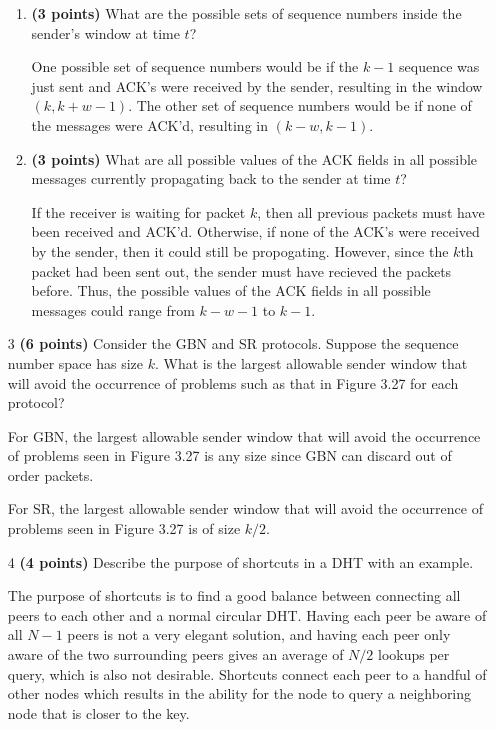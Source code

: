 \documentclass{article}
\begin{document}
\begin{enumerate}
  \begin{enumerate}
  \item \textbf{(3 points)} What are the possible sets of sequence numbers inside the sender’s window at time $t$?

  One possible set of sequence numbers would be if the $k-1$ sequence was just sent and ACK's were received by the sender, resulting in the window $(k, k + w - 1)$. The other set of sequence numbers would be if none of the messages were ACK'd, resulting in $(k - w, k - 1)$.

  \item \textbf{(3 points)} What are all possible values of the ACK fields in all possible messages currently propagating back to the sender at time $t$?

  If the receiver is waiting for packet $k$, then all previous packets must have been received and ACK'd. Otherwise, if none of the ACK's were received by the sender, then it could still be propogating. However, since the $k$th packet had been sent out, the sender must have recieved the packets before. Thus, the possible values of the ACK fields in all possible messages could range from $k - w - 1$ to $k - 1$. 

  \end{enumerate}
 
\item[3]\textbf{(6 points)} Consider the GBN and SR protocols. Suppose the sequence number space has size $k$. What is the largest allowable sender window that will avoid the occurrence of problems such as that in Figure 3.27 for each protocol?

For GBN, the largest allowable sender window that will avoid the occurrence of problems seen in Figure 3.27 is any size since GBN can discard out of order packets.

For SR, the largest allowable sender window that will avoid the occurrence of problems seen in Figure 3.27 is of size $k/2$.

\item[4]\textbf{(4 points)} Describe the purpose of shortcuts in a DHT with an example.

The purpose of shortcuts is to find a good balance between connecting all peers to each other and a normal circular DHT. Having each peer be aware of all $N-1$ peers is not a very elegant solution, and having each peer only aware of the two surrounding peers gives an average of $N/2$ lookups per query, which is also not desirable. Shortcuts connect each peer to a handful of other nodes which results in the ability for the node to query a neighboring node that is closer to the key.


\end{enumerate}
\end{document}

